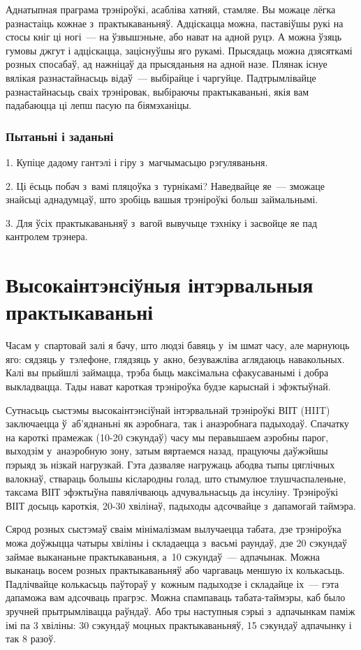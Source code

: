 Аднатыпная праграма трэніроўкі, асабліва хатняй, стамляе. Вы можаце лёгка разнастаіць кожнае з~практыкаваньняў. Адціскацца можна, паставіўшы рукі на стосы кніг ці ногі~--- на ўзвышэньне, або нават на адной руцэ. А можна ўзяць гумовы джгут і адціскацца, заціснуўшы яго рукамі. Прысядаць можна дзясяткамі розных спосабаў, ад нажніцаў да прысяданьня на адной назе. Плянак існуе вялікая разнастайнасьць відаў~--- выбірайце і чаргуйце. Падтрымлівайце разнастайнасьць сваіх трэніровак, выбіраючы практыкаваньні, якія вам падабаюцца ці лепш пасую па біямэханіцы.

\subsubsection{Пытаньні і заданьні}

1. Купіце дадому гантэлі і гіру з~магчымасьцю рэгуляваньня.

2. Ці ёсьць побач з~вамі пляцоўка з~турнікамі? Наведвайце яе~--- зможаце знайсьці аднадумцаў, што зробіць вашыя трэніроўкі больш займальнымі.

3. Для ўсіх практыкаваньняў з~вагой вывучыце тэхніку і засвойце яе пад кантролем трэнера.


\section{Высокаінтэнсіўныя інтэрвальныя практыкаваньні}

Часам у~спартовай залі я бачу, што людзі бавяць у~ім шмат часу, але марнуюць яго: сядзяць у~тэлефоне, глядзяць у~акно, безуважліва аглядаюць навакольных. Калі вы прыйшлі займацца, трэба быць максімальна сфакусаванымі і добра выкладвацца. Тады нават кароткая трэніроўка будзе карыснай і эфэктыўнай.

Сутнасьць сыстэмы высокаінтэнсіўнай інтэрвальнай трэніроўкі ВІІТ (HIIT) заключаецца ў~аб'яднаньні як аэробнага, так і анаэробнага падыходаў. Спачатку на кароткі прамежак (10-20 сэкундаў) часу мы перавышаем аэробны парог, выходзім у~анаэробную зону, затым вяртаемся назад, працуючы даўжэйшы пэрыяд зь нізкай нагрузкай. Гэта дазваляе нагружаць абодва тыпы цяглічных валокнаў, ствараць большы кіслародны голад, што стымулюе тлушчаспаленьне, таксама ВІІТ эфэктыўна павялічваюць адчувальнасьць да інсуліну. Трэніроўкі ВІІТ досыць кароткія, 20-30 хвілінаў, падыходы адсочвайце з~дапамогай таймэра.

Сярод розных сыстэмаў сваім мінімалізмам вылучаецца табата, дзе трэніроўка можа доўжыцца чатыры хвіліны і складаецца з~васьмі раундаў, дзе 20 сэкундаў займае выкананьне практыкаваньня, а~10 сэкундаў~--- адпачынак. Можна выканаць восем розных практыкаваньняў або чаргаваць меншую іх колькасьць. Падлічвайце колькасьць паўтораў у~кожным падыходзе і складайце іх~--- гэта дапаможа вам адсочваць прагрэс. Можна спампаваць табата-таймэры, каб было зручней прытрымлівацца раўндаў. Або тры наступныя сэрыі з~адпачынкам паміж імі па 3 хвіліны: 30 сэкундаў моцных практыкаваньняў, 15 сэкундаў адпачынку і так 8 разоў.

